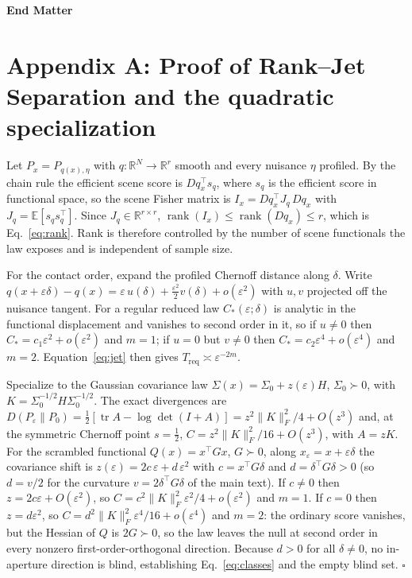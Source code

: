 \documentclass[aps,prl,reprint,groupedaddress,superscriptaddress,floatfix]{revtex4-2}
\newcommand{\Treq}{T_{\mathrm{req}}}
\newcommand{\Cstar}{C_{\ast}}
\newcommand{\tr}{\operatorname{tr}}
\newcommand{\rank}{\operatorname{rank}}
\newcommand{\eps}{\varepsilon}
\begin{document}
\begin{acknowledgments}
\end{acknowledgments}

\clearpage
\onecolumngrid
\begin{center}\textbf{\large End Matter}\end{center}
\twocolumngrid

\section*{Appendix A: Proof of Rank--Jet Separation and the quadratic specialization}
Let $P_x=P_{q(x),\eta}$ with $q:\mathbb{R}^N\!\to\mathbb{R}^r$ smooth and every
nuisance $\eta$ profiled. By the chain rule the efficient scene score is
$Dq_x^{\!\top}s_q$, where $s_q$ is the efficient score in functional space, so the
scene Fisher matrix is $I_x=Dq_x^{\!\top}J_q\,Dq_x$ with $J_q=\mathbb{E}[s_q
s_q^{\!\top}]$. Since $J_q\in\mathbb{R}^{r\times r}$, $\rank(I_x)\le\rank(Dq_x)\le
r$, which is Eq.~\eqref{eq:rank}. Rank is therefore controlled by the number of
scene functionals the law exposes and is independent of sample size.

For the contact order, expand the profiled Chernoff distance along $\delta$. Write
$q(x+\eps\delta)-q(x)=\eps\,u(\delta)+\tfrac{\eps^2}{2}v(\delta)+o(\eps^2)$ with
$u,v$ projected off the nuisance tangent. For a regular reduced law
$\Cstar(\eps;\delta)$ is analytic in the functional displacement and vanishes to
second order in it, so if $u\neq0$ then
$\Cstar=c_1\eps^2+o(\eps^2)$ and $m=1$; if $u=0$ but $v\neq0$ then
$\Cstar=c_2\eps^4+o(\eps^4)$ and $m=2$. Equation~\eqref{eq:jet} then gives
$\Treq\asymp\eps^{-2m}$.

Specialize to the Gaussian covariance law $\Sigma(x)=\Sigma_0+z(\eps)H$,
$\Sigma_0\succ0$, with $K=\Sigma_0^{-1/2}H\Sigma_0^{-1/2}$. The exact divergences
are $D(P_\eps\|P_0)=\tfrac12[\tr A-\log\det(I+A)]=z^2\|K\|_F^2/4+O(z^3)$ and, at
the symmetric Chernoff point $s=\tfrac12$, $C=z^2\|K\|_F^2/16+O(z^3)$, with
$A=z K$. For the scrambled functional $Q(x)=x^{\!\top}Gx$, $G\succ0$, along
$x_\eps=x+\eps\delta$ the covariance shift is $z(\eps)=2c\,\eps+d\,\eps^2$ with
$c=x^{\!\top}G\delta$ and $d=\delta^{\!\top}G\delta>0$ (so $d=v/2$ for the
curvature $v=2\delta^{\!\top}G\delta$ of the main text). If $c\neq0$ then
$z=2c\eps+O(\eps^2)$, so $C=c^2\|K\|_F^2\eps^2/4+o(\eps^2)$ and $m=1$. If $c=0$
then $z=d\eps^2$, so $C=d^2\|K\|_F^2\eps^4/16+o(\eps^4)$ and $m=2$: the ordinary
score vanishes, but the Hessian of $Q$ is $2G\succ0$, so the law leaves the null
at second order in every nonzero first-order-orthogonal direction. Because
$d>0$ for all $\delta\neq0$, no in-aperture direction is blind, establishing
Eq.~\eqref{eq:classes} and the empty blind set. \hfill$\square$
\end{document}
